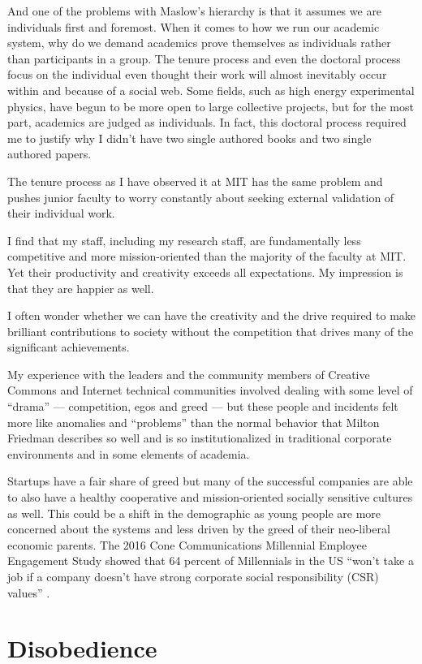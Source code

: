 And one of the problems with Maslow's hierarchy is that it assumes we are individuals first and foremost. When it comes to how we run our academic system, why do we demand academics prove themselves as individuals rather than participants in a group. The tenure process and even the doctoral process focus on the individual even thought their work will almost inevitably occur within and because of a social web. Some fields, such as high energy experimental physics, have begun to be more open to large collective projects, but for the most part, academics are judged as individuals. In fact, this doctoral process required me to justify why I didn't have two single authored books and two single authored papers.

The tenure process as I have observed it at MIT has the same problem and pushes junior faculty to worry constantly about seeking external validation of their individual work.

I find that my staff, including my research staff, are fundamentally less competitive and more mission-oriented than the majority of the faculty at MIT. Yet their productivity and creativity exceeds all expectations. My impression is that they are happier as well.

I often wonder whether we can have the creativity and the drive required to make brilliant contributions to society without the competition that drives many of the significant achievements.

My experience with the leaders and the community members of Creative Commons and  Internet technical communities involved dealing with some level of ``drama'' --- competition, egos and greed --- but these people and incidents felt more like anomalies and ``problems'' than the normal behavior that Milton Friedman describes so well and is so institutionalized in traditional corporate environments and in some elements of academia.

Startups have a fair share of greed but many of the successful companies are able to also have a healthy cooperative and mission-oriented socially sensitive cultures as well. This could be a shift in the demographic as young people are more concerned about the systems and less driven by the greed of their neo-liberal economic parents. The 2016 Cone Communications Millennial Employee Engagement Study showed that 64 percent of Millennials in the US ``won’t take a job if a company doesn’t have strong corporate social responsibility (CSR) values'' \cite{conestudy}.

\section{Disobedience}

